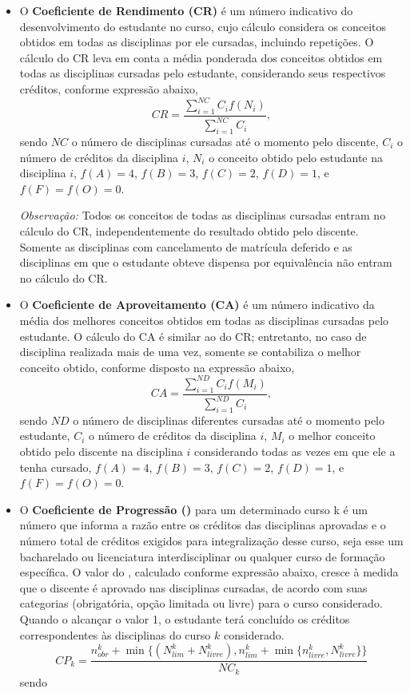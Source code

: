 \begin{itemize}
\item O \textbf{Coeficiente de Rendimento (CR)} é um número indicativo do desenvolvimento do
estudante no curso, cujo cálculo considera os conceitos obtidos em todas as disciplinas
por ele cursadas, incluindo repetições. O cálculo do CR leva em conta a média
ponderada dos conceitos obtidos em todas as disciplinas cursadas pelo estudante,
considerando seus respectivos créditos, conforme expressão abaixo,
\[
  CR = \dfrac{\sum_{i=1}^{NC}C_if(N_i)}{\sum_{i=1}^{NC}{C_i}},
\]
sendo $NC$ o número de disciplinas cursadas até o momento pelo discente, $C_i$ o número
de créditos da disciplina $i$, $N_i$ o conceito obtido pelo estudante na disciplina $i$, $f(A) = 4$,
$f(B) = 3$, $f(C) = 2$, $f(D) = 1$, e $f(F) = f(O) = 0$.

{\em Observação:} Todos os conceitos de todas as disciplinas cursadas entram no cálculo do
CR, independentemente do resultado obtido pelo discente. Somente as disciplinas com
cancelamento de matrícula deferido e as disciplinas em que o estudante obteve
dispensa por equivalência não entram no cálculo do CR.

\item O \textbf{Coeficiente de Aproveitamento (CA)} é um número indicativo da média dos
melhores conceitos obtidos em todas as disciplinas cursadas pelo estudante. O cálculo
do CA é similar ao do CR; entretanto, no caso de disciplina realizada mais de uma vez,
somente se contabiliza o melhor conceito obtido, conforme disposto na expressão
abaixo,
\[
  CA = \dfrac{\sum_{i=1}^{ND}C_if(M_i)}{\sum_{i=1}^{ND}C_i},
\]
sendo $ND$ o número de disciplinas diferentes cursadas até o momento pelo estudante,
$C_i$ o número de créditos da disciplina $i$, $M_i$ o melhor conceito obtido pelo discente na
disciplina $i$ considerando todas as vezes em que ele a tenha cursado, $f(A) = 4$, $f(B) = 3$,
$f(C) = 2$, $f(D) = 1$, e $f(F) = f(O) = 0$.

\item O \textbf{Coeficiente de Progressão (\cpk)} para um determinado curso k é um número que
informa a razão entre os créditos das disciplinas aprovadas e o número total de
créditos exigidos para integralização desse curso, seja esse um bacharelado ou
licenciatura interdisciplinar ou qualquer curso de formação específica. O valor do \cpk,
calculado conforme expressão abaixo, cresce à medida que o discente é aprovado nas
disciplinas cursadas, de acordo com suas categorias (obrigatória, opção limitada ou
livre) para o curso considerado. Quando o \cpk alcançar o valor 1, o estudante terá
concluído os créditos correspondentes às disciplinas do curso $k$ considerado.
\[
  CP_k = \frac{n^k_{obr} + \min\{
      (N^k_{lim} + N^k_{livre}),
      n^k_{lim} + \min\{n^k_{livre},N^k_{livre}\}
    \} }{NC_k}
\]
sendo
\begin{itemize}


\end{itemize}
\end{itemize}
